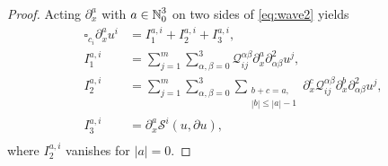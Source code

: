 \documentclass[10pt,a4paper]{amsart}
\def\N{\mathop{\mathbb N\kern 0pt}\nolimits}
\def\cQ{\mathcal Q}
\def\p{\partial}
\begin{document}
\begin{proof}
	Acting $\partial_x^a$ with $a\in\N_0^3$ on two sides of \eqref{eq:wave2} yields
	\begin{equation}\label{3.5}
		\begin{aligned}
			\square_{c_i}\partial_x^a u^i &= I_1^{a,i} + I_2^{a,i} +  I_3^{a,i},\\	
			I_1^{a,i} &= \sum_{j=1}^m\sum_{\alpha,\beta=0}^3 \cQ^{\alpha\beta}_{ij} \p_x^a\partial_{\alpha\beta}^2 u^j, \\
			I_2^{a,i} &= \sum_{j=1}^m\sum_{\alpha,\beta=0}^3\sum_{\substack{b+c=a, \\ |b| \leq |a|-1}}  \p_x^c\cQ^{\alpha\beta}_{ij} \p_x^b\partial_{\alpha\beta}^2 u^j, \\
			I_3^{a,i} &= \p_x^a\mathcal{S}^i(u,\p u),\\
		\end{aligned}
	\end{equation}
	where $I_2^{a,i}$ vanishes for $|a|=0$.


\end{proof}
\end{document}

